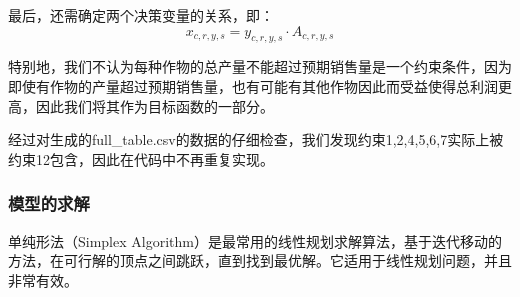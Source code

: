 \documentclass[withoutpreface]{cumcmthesis}
\begin{document}
最后，还需确定两个决策变量的关系，即：
\begin{equation}
    x_{c,r,y,s} = y_{c,r,y,s} \cdot A_{c,r,y,s}
\end{equation}



特别地，我们不认为每种作物的总产量不能超过预期销售量是一个约束条件，因为即使有作物的产量超过预期销售量，也有可能有其他作物因此而受益使得总利润更高，因此我们将其作为目标函数的一部分。

经过对生成的full\_table.csv的数据的仔细检查，我们发现约束1,2,4,5,6,7实际上被约束12包含，因此在代码中不再重复实现。


\subsubsection{模型的求解}
单纯形法（Simplex Algorithm）是最常用的线性规划求解算法，基于迭代移动的方法，在可行解的顶点之间跳跃，直到找到最优解。它适用于线性规划问题，并且非常有效。
\end{document}

